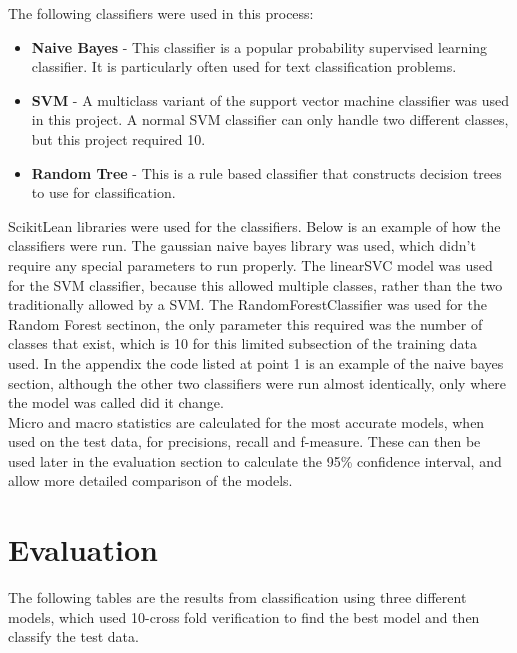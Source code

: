 \documentclass[11pt]{article}
\begin{document}
The following classifiers were used in this process:
\begin{itemize}
\item \textbf{Naive Bayes} - This classifier is a popular probability supervised learning classifier. It is particularly often used for text classification problems.
\item \textbf{SVM} - A multiclass variant of the support vector machine classifier was used in this project. A normal SVM classifier can only handle two different classes, but this project required 10.
\item \textbf{Random Tree} - This is a rule based classifier that constructs decision trees to use for classification.
\end{itemize}

ScikitLean libraries were used for the classifiers. Below is an example of how the classifiers were run. The gaussian naive bayes library was used, which didn't require any special parameters to run properly. The linearSVC model was used for the SVM classifier, because this allowed multiple classes, rather than the two traditionally allowed by a SVM. The RandomForestClassifier was used for the Random Forest sectinon, the only parameter this required was the number of classes that exist, which is 10 for this limited subsection of the training data used. In the appendix the code listed at point 1 is an example of the naive bayes section, although the other two classifiers were run almost identically, only where the model was called did it change. \\

Micro and macro statistics are calculated for the most accurate models, when used on the test data, for precisions, recall and f-measure. These can then be used later in the evaluation section to calculate the 95\% confidence interval, and allow more detailed comparison of the models. \\

\section{Evaluation}
The following tables are the results from classification using three different models, which used 10-cross fold verification to find the best model and then classify the test data.
\end{document}
